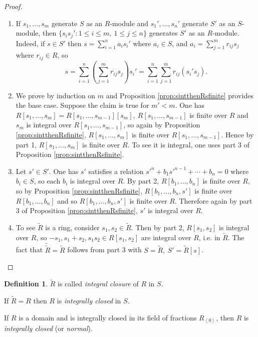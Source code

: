 \documentclass[a4paper]{article}
\newcommand{\la}{\left\langle}
\newcommand{\ra}{\right\rangle}
\theoremstyle{definition}
\newtheorem{defn}{Definition}[subsection]
\begin{document}
\begin{proof}
\begin{enumerate}
\item If $s_1,\ldots,s_m$ generate $S$ as an $R$-module and $s_1',\ldots,s_n'$ generate $S'$ as an $S$-module, then $\{s_is_j':1\leq i\leq m,\ 1\leq j\leq n\}$ generates $S'$ as an $R$-module. Indeed, if $s\in S'$ then $s=\sum_{i=1}^n a_is_i'$ where $a_i\in S$, and $a_i=\sum_{j=1}^m r_{ij}s_j$ where $r_{ij}\in R$, so
\[
s=\sum_{i=1}^n \left(\sum_{j=1}^m r_{ij}s_j\right)s_i'=\sum_{i=1}^n \sum_{j=1}^m r_{ij} (s_i's_j).
\]
\item We prove by induction on $m$ and Proposition \ref{prop:sintthenRsfinite} provides the base case. Suppose the claim is true for $m'<m$. One has $R[s_1,\ldots,s_m]=R[s_1,\ldots,s_{m-1}][s_m],\ R[s_1,\ldots,s_{m-1}]$ is finite over $R$ and $s_m$ is integral over $R[s_1,\ldots,s_{m-1}]$, so again by Proposition \ref{prop:sintthenRsfinite}, $R[s_1,\ldots,s_m]$ is finite over $R[s_1,\ldots,s_{m-1}]$. Hence by part 1, $R[s_1,\ldots,s_{m}]$ is finite over $R$. To see it is integral, one uses part 3 of Proposition \ref{prop:sintthenRsfinite}.
\item Let $s'\in S'$. One has $s'$ satisfies a relation $s'^n+b_1s'^{n-1}+\cdots+b_n=0$ where $b_i\in S$, so each $b_i$ is integral over $R$. By part 2, $R[b_1,\ldots,b_n]$ is finite over $R$, so by Proposition \ref{prop:sintthenRsfinite}, $R[b_1,\ldots,b_n,s']$ is finite over $R[b_1,\ldots,b_n]$ and so $R[b_1,\ldots,b_n,s']$ is finite over $R$. Therefore again by part 3 of Proposition \ref{prop:sintthenRsfinite}, $s'$ is integral over $R$.
\item To see $\widetilde R$ is a ring, consider $s_1,s_2\in\widetilde R$. Then by part 2, $R[s_1,s_2]$ is integral over $R$, so $-s_1,s_1+s_2,s_1s_2\in R[s_1,s_2]$ are integral over $R$, i.e. in $\widetilde R$. The fact that $\widetilde{\widetilde R}=\widetilde R$ follows from part 3 with $S=\widetilde R,\ S'=\widetilde R[s]$.
\end{enumerate}
\end{proof}

\begin{defn}
$\widetilde R$ is called \textit{integral closure} of $R$ in $S$.

If $\widetilde R=R$ then $R$ is \textit{integrally closed} in $S$.

If $R$ is a domain and is integrally closed in its field of fractions $R_{\la 0\ra}$, then $R$ is \textit{integrally closed} (or \textit{normal}).
\end{defn}
\end{document}
